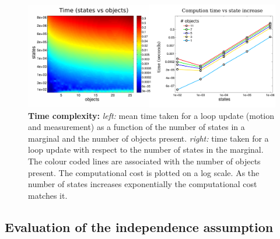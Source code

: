\begin{figure}
 \includegraphics[width=\textwidth]{./ch5-MLMF/Figures/Figure12_v2.pdf}
 \caption{\textbf{Time complexity:} \textit{left:} mean time taken for a loop update (motion and measurement) as a function of the number of states in a marginal and the 
 number of objects present. \textit{right:} time taken for a loop update with respect to the number of states in the marginal. The colour coded lines are 
 associated with the number of objects present. The computational cost is plotted on a log scale. As the number of states increases exponentially the
 computational cost matches it.}
 \label{fig:time_complexity}
\end{figure}


\subsection{Evaluation of the independence assumption}\label{subsec:eval_indep_assumptiom}

